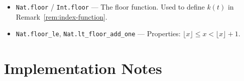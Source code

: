 \documentclass[11pt,a4paper]{article}
\theoremstyle{definition}
\begin{document}
\begin{itemize}
  \item \texttt{Nat.floor} / \texttt{Int.floor} ---
    The floor function. Used to define $k(t)$ in
    Remark~\ref{rem:index-function}.

  \item \texttt{Nat.floor\_le}, \texttt{Nat.lt\_floor\_add\_one} ---
    Properties: $\lfloor x \rfloor \le x < \lfloor x \rfloor + 1$.
\end{itemize}


\section{Implementation Notes}\label{sec:implementation}
\end{document}
